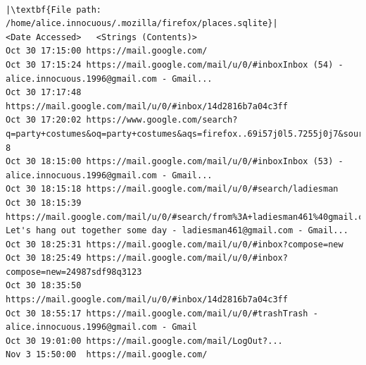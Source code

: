 \documentclass[addpoints]{exam}
\begin{document}
\begin{questions}
\begin{lstlisting}
\end{lstlisting}

\pagebreak

\begin{lstlisting}

|\textbf{File path: /home/alice.innocuous/.mozilla/firefox/places.sqlite}|
<Date Accessed>   <Strings (Contents)>   
Oct 30 17:15:00 https://mail.google.com/
Oct 30 17:15:24 https://mail.google.com/mail/u/0/#inboxInbox (54) - alice.innocuous.1996@gmail.com - Gmail...
Oct 30 17:17:48 https://mail.google.com/mail/u/0/#inbox/14d2816b7a04c3ff
Oct 30 17:20:02 https://www.google.com/search?q=party+costumes&oq=party+costumes&aqs=firefox..69i57j0l5.7255j0j7&sourceid=firefox&ex_sm=119&ie=UTF-8
Oct 30 18:15:00 https://mail.google.com/mail/u/0/#inboxInbox (53) - alice.innocuous.1996@gmail.com - Gmail...
Oct 30 18:15:18 https://mail.google.com/mail/u/0/#search/ladiesman
Oct 30 18:15:39 https://mail.google.com/mail/u/0/#search/from%3A+ladiesman461%40gmail.com/14d2816b7a04c3ffHey! Let's hang out together some day - ladiesman461@gmail.com - Gmail...
Oct 30 18:25:31 https://mail.google.com/mail/u/0/#inbox?compose=new
Oct 30 18:25:49 https://mail.google.com/mail/u/0/#inbox?compose=new=24987sdf98q3123
Oct 30 18:35:50 https://mail.google.com/mail/u/0/#inbox/14d2816b7a04c3ff
Oct 30 18:55:17 https://mail.google.com/mail/u/0/#trashTrash - alice.innocuous.1996@gmail.com - Gmail
Oct 30 19:01:00 https://mail.google.com/mail/LogOut?...
Nov 3 15:50:00  https://mail.google.com/

\end{lstlisting}

\end{questions}
\end{document}
